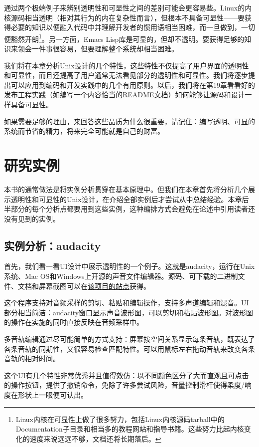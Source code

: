 \documentclass[12pt,oneside]{book}
\begin{document}
通过两个极端例子来辨别透明性和可显性之间的差别可能会更容易些。Linux的内核源码相当透明（相对其行为的内在复杂性而言），但根本不具备可显性——要获得必要的知识以便融入代码中并理解开发者的惯用语相当困难，而一旦做到，一切便豁然开朗\footnote{Linux内核在可显性上做了很多努力，包括Linux内核源码tarball中的Documentation子目录和相当多的教程网站和指导书籍。这些努力比起内核变化的速度来说远远不够，文档还将长期落后。}。另一方面，Emacs Lisp库是可显的，但却不透明。要获得足够的知识来领会一件事很容易，但要理解整个系统却相当困难。

我们将在本章分析Unix设计的几个特性，这些特性不仅提高了用户界面的透明性和可显性，而且还提高了用户通常无法看见部分的透明性和可显性。我们将逐步提出可以应用到编码和开发实践中的几个有用原则。以后，我们将在第19章看看好的发布工程实践（如编写一个内容恰当的README文档）如何能够让源码和设计一样具备可显性。

如果需要足够的理由，来回答这些品质为什么很重要，请记住：编写透明、可显的系统而节省的精力，将来完全可能就是自己的财富。


\section{研究实例}
本书的通常做法是将实例分析贯穿在基本原理中。但我们在本章首先将分析几个展示透明性和可显性的Unix设计，在介绍全部实例后才尝试从中总结经验。本章后半部分的每个分析点都要用到这些实例，这种编排方式会避免在论述中引用读者还没有见到的实例。

\subsection{实例分析：audacity}
首先，我们看一看UI设计中展示透明性的一个例子。这就是audacity，运行在Unix系统、Mac OS和Windows上开源的声音文件编辑器。源码、可下载的二进制文件、文档和屏幕截图可以在\href{http://audacity.sourceforge.net/}{该项目的站点}获得。

这个程序支持对音频采样的剪切、粘贴和编辑操作，支持多声道编辑和混音。UI部分相当简洁：audacity窗口显示声音波形图，可以剪切和粘贴波形图。对波形图的操作在实施的同时直接反映在音频采样中。

多音轨编辑通过尽可能简单的方式支持：屏幕按空间关系显示每条音轨，既表达了各条音轨的同期性，又很容易检查匹配特性。可以用鼠标左右拖动音轨来改变各条音轨的相对时间。

这个UI有几个特性非常优秀并且值得效仿：以不同颜色区分了大而直观且可点击的操作按钮，提供了撤销命令，免除了许多尝试风险，音量控制滑杆使得柔度/响度在形状上一眼便可认出。
\end{document}
